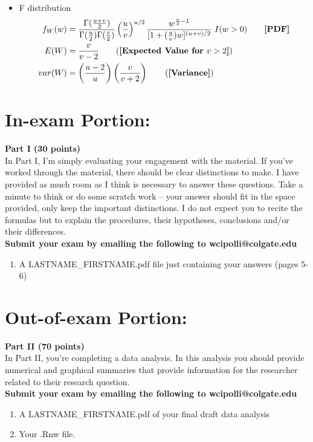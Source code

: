 \documentclass{article}
\begin{document}
\begin{multicols}{2}
\begin{itemize}
\begin{align*}
  \end{align*}
  \item F distribution
  \begin{align*}
    f_W(w)&=\frac{\Gamma(\frac{u+v}{2})}{\Gamma(\frac{u}{2})\Gamma(\frac{v}{2})}
\left(\frac{u}{v}\right)^{u/2}\frac{w^{\frac{u}{2}-1}}{[1+(\frac{u}{v})w]^{(u+v)/2}}~I(w>0) \tag*{\textbf{[PDF]}}\\
    E(W)&=\frac{v}{v-2} \tag{\textbf{[Expected Value for $v>2$]}}\\
    var(W)&=\left(\frac{u-2}{u}\right) \left(\frac{v}{v+2}\right) \tag{\textbf{[Variance]}}\\
  \end{align*}
  \end{itemize}
  \end{multicols}
\newpage
\section{In-exam Portion:}
\noindent \textbf{Part I (30 points)}\\
In Part I, I'm simply evaluating your engagement with the material. If you've worked
through the material, there should be clear distinctions to make. I have provided
as much room as I think is necessary to answer these questions. Take a minute to think
or do some scratch work -- your answer should fit in the space provided, only keep 
the important distinctions. I do not expect you to recite the formulas but to explain 
the procedures, their hypotheses, conclusions and/or their differences.\\

\noindent \textbf{Submit your exam by emailing the following to wcipolli@colgate.edu}
\begin{enumerate}
  \item A LASTNAME\_FIRSTNAME.pdf file just containing your answers (pages 5-6)
\end{enumerate}

\section{Out-of-exam Portion:}
\noindent \textbf{Part II (70 points)}\\
In Part II, you're completing a data analysis. In this analysis you should provide 
numerical and graphical summaries that provide information for the researcher
related to their research question. \\

\noindent \textbf{Submit your exam by emailing the following to wcipolli@colgate.edu}
\begin{enumerate}
  \item A LASTNAME\_FIRSTNAME.pdf of your final draft data analysis
  \item Your .Rnw file.
\end{enumerate}
\end{document}
